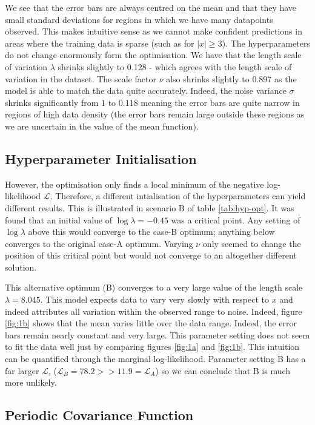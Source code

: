 \documentclass[]{article}
\newcommand{\Lcal}{\mathcal{L}}
\begin{document}
We see that the error bars are always centred on the mean and that they have small standard deviations for regions in which we have many datapoints observed. This makes intuitive sense as we cannot make confident predictions in areas where the training data is sparse (such as for $|x| \geq 3$). The hyperparameters do not change enormously form the optimisation. We have that the length scale of variation $\lambda$ shrinks slightly to 0.128 - which agrees with the length scale of variation in the dataset. The scale factor $\nu$ also shrinks slightly to 0.897 as the model is able to match the data quite accurately. Indeed, the noise variance $\sigma$ shrinks significantly from 1 to 0.118 meaning the error bars are quite narrow in regions of high data density (the error bars remain large outside these regions as we are uncertain in the value of the mean function).

\subsection{Hyperparameter Initialisation}

However, the optimisation only finds a local minimum of the negative log-likelihood $\Lcal$. Therefore, a different intialisation of the hyperparameters can yield different results. This is illustrated in scenario B of table \ref{tab:hyp-opt}. It was found that an initial value of $\log \lambda = -0.45$ was a critical point. Any setting of $\log \lambda$ above this would converge to the case-B optimum; anything below converges to the original case-A optimum. Varying $\nu$ only seemed to change the position of this critical point but would not converge to an altogether different solution.

This alternative optimum (B) converges to a very large value of the length scale $\lambda=8.045$. This model expects data to vary very slowly with respect to $x$ and indeed attributes all variation within the observed range to noise. Indeed, figure \ref{fig:1b} shows that the mean varies little over the data range. Indeed, the error bars remain nearly constant and very large. This parameter setting does not seem to fit the data well just by comparing figures \ref{fig:1a} and \ref{fig:1b}. This intuition can be quantified through the marginal log-likelihood. Parameter setting B has a far larger $\Lcal$, ($\Lcal_B=78.2 >> 11.9 = \Lcal_A$) so we can conclude that B is much more unlikely.


\subsection{Periodic Covariance Function}
\end{document}
